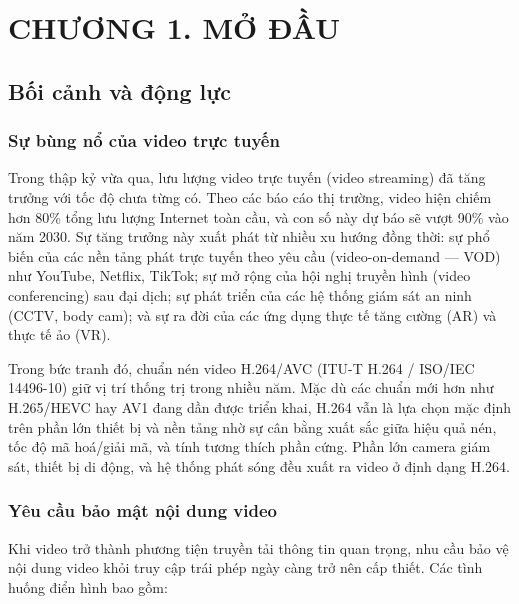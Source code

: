 \clearpage
{}
\section*{CHƯƠNG 1. MỞ ĐẦU}
\setcounter{section}{1}
\setcounter{subsection}{0}
\setcounter{figure}{0}
\setcounter{table}{0}
\setcounter{equation}{0}

\subsection{Bối cảnh và động lực}

\subsubsection{Sự bùng nổ của video trực tuyến}

Trong thập kỷ vừa qua, lưu lượng video trực tuyến (video streaming) đã tăng trưởng
với tốc độ chưa từng có. Theo các báo cáo thị trường, video hiện chiếm hơn 80\%
tổng lưu lượng Internet toàn cầu, và con số này dự báo sẽ vượt 90\% vào năm 2030.
Sự tăng trưởng này xuất phát từ nhiều xu hướng đồng thời: sự phổ biến của các
nền tảng phát trực tuyến theo yêu cầu (video-on-demand --- VOD) như YouTube, Netflix,
TikTok; sự mở rộng của hội nghị truyền hình (video conferencing) sau đại dịch;
sự phát triển của các hệ thống giám sát an ninh (CCTV, body cam); và sự ra đời
của các ứng dụng thực tế tăng cường (AR) và thực tế ảo (VR).

Trong bức tranh đó, chuẩn nén video H.264/AVC (ITU-T H.264 / ISO/IEC 14496-10)
\cite{itu_h264} giữ vị trí thống trị trong nhiều năm. Mặc dù các chuẩn mới hơn như
H.265/HEVC hay AV1 đang dần được triển khai, H.264 vẫn là lựa chọn mặc định
trên phần lớn thiết bị và nền tảng nhờ sự cân bằng xuất sắc giữa hiệu quả nén,
tốc độ mã hoá/giải mã, và tính tương thích phần cứng. Phần lớn camera giám sát,
thiết bị di động, và hệ thống phát sóng đều xuất ra video ở định dạng H.264.

\subsubsection{Yêu cầu bảo mật nội dung video}

Khi video trở thành phương tiện truyền tải thông tin quan trọng, nhu cầu bảo vệ
nội dung video khỏi truy cập trái phép ngày càng trở nên cấp thiết. Các tình huống
điển hình bao gồm:

